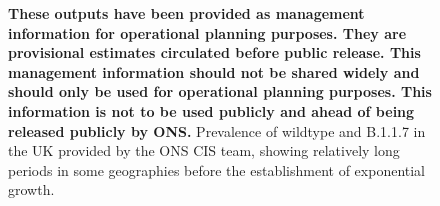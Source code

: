 \documentclass[10pt,a4paper]{article}
\begin{document}
\begin{figure}
\centering
{}
\caption{\textbf{These outputs have been provided as management information for
operational planning purposes. They are provisional estimates circulated before
public release. This management information should not be shared widely and
should only be used for operational planning purposes. This information is not
to be used publicly and ahead of being released publicly by ONS.} Prevalence of
wildtype and B.1.1.7 in the UK provided by the ONS CIS team, showing relatively
long periods in some geographies before the establishment of exponential
growth.}
\label{fig:ONS}
\end{figure}

\clearpage
\end{document}
